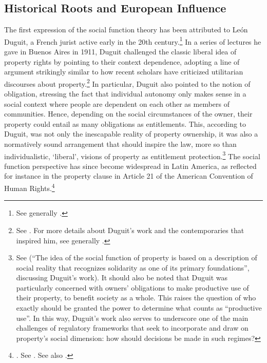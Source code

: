 \subsection{Historical Roots and European Influence}\label{sec:2:4:1}

The first expression of the social function theory has been attributed to Le{\'o}n Duguit, a French jurist active early in the 20th century.\footnote{See generally \cite{foster11}.} In a series of lectures he gave in Buenos Aires in 1911, Duguit challenged the classic liberal idea of property rights by pointing to their context dependence, adopting a line of argument strikingly similar to how recent scholars have criticized utilitarian discourses about property.\footnote{See \cite[1004-1008]{foster11}. For more details about Duguit's work and the contemporaries that inspired him, see generally \cite{mirow10}.} In particular, Duguit also pointed to the notion of obligation, stressing the fact that individual autonomy only makes sense in a social context where people are dependent on each other as members of  communities. Hence, depending on the social circumstances of the owner, their property could entail as many obligations as entitlements. This, according to Duguit, was not only the inescapable reality of property ownership, it was also a normatively sound arrangement that should inspire the law, more so than individualistic, `liberal', visions of property as entitlement protection.\footnote{See \cite[1005]{foster11} (``The idea of the social function of property is based on a description of social reality that recognizes solidarity as one of its primary foundations'', discussing Duguit's work). It should also be noted that Duguit was particularly concerned with owners' obligations to make productive use of their property, to benefit society as a whole. This raises the question of who exactly should be granted the power to determine what counts as ``productive use''. In this way, Duguit's work also serves to underscore one of the main challenges of regulatory frameworks that seek to incorporate and draw on property's social dimension: how should decisions be made in such regimes?} The social function perspective has since become widespread in Latin America, as reflected for instance in the property clause in Article 21 of the American Convention of Human Rights.\footnote{\cite{achr}. See \cite[61-62]{banning02}. See also \cite{cunha11,mirow11,bonilla11}.}


